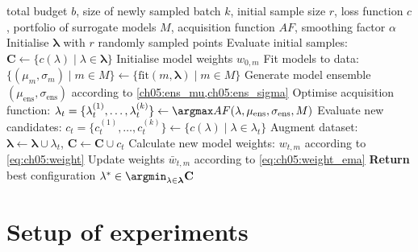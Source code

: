 \begin{algorithm}
  \caption{\texttt{DyMBO:} Dynamic Complementary Surrogate Models in BO}
  
  \begin{algorithmic}[1]
         total budget $b$, size of newly sampled batch $k$, initial sample size $r$, loss function $c$, portfolio of surrogate models $M$, acquisition function $AF$, smoothing factor $\alpha$
        \STATE Initialise $\boldsymbol{\lambda}$ with $r$ randomly sampled points
        \STATE Evaluate initial samples: $\boldsymbol{C} \gets \{c(\lambda) \mid \lambda\in \boldsymbol{\lambda}\}$
        \STATE Initialise model weights $w_{0,m}$ 
            \STATE Fit models to data: $\{(\mu_{m},\sigma_{m}) \mid m \in M\}\gets \{\text{fit}(m, \boldsymbol{\lambda}) \mid m\in M\}$
            \STATE Generate model ensemble $(\mu_\text{ens},\sigma_\text{ens})$ according to \cref{ch05:ens_mu,ch05:ens_sigma}
            \STATE Optimise acquisition function: $\lambda_t = \{\lambda_{t}^{(1)},\ldots,\lambda_t^{(k)}\}\gets \argmax AF(\lambda,\mu_\text{ens},\sigma_\text{ens},M)$
            \STATE Evaluate new candidates: $c_t = \{c_{t}^{(1)},\ldots,c_t^{(k)}\} \gets \{c(\lambda) \mid \lambda\in \lambda_t\}$
            \STATE Augment dataset: $\boldsymbol{\lambda} \gets \boldsymbol{\lambda} \cup \lambda_t$, $\mathbf{C} \gets \mathbf{C} \cup c_t$
            \STATE Calculate new model weights: ${w}_{t,m}$ according to \cref{eq:ch05:weight}
            \STATE Update weights $\bar{w}_{t,m}$ according to \cref{eq:ch05:weight_ema}
        \ENDWHILE
        \STATE \textbf{Return} best configuration $\lambda^* \in \argmin_{\lambda \in \boldsymbol{\lambda}} \mathbf{C}$
  \end{algorithmic}
  \label{alg:ch05:debo}
\end{algorithm}







\section{Setup of experiments}
\label{sec:ch05:experiments}



